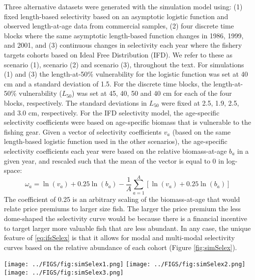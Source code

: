 Three alternative datasets were generated with the simulation model using: (1) fixed length-based selectivity based on an asymptotic logistic function and observed length-at-age data from commercial samples, (2) four discrete time blocks where the same asymptotic length-based function changes in 1986, 1999, and 2001, and (3) continuous changes in selectivity each year where the fishery targets cohorts based on Ideal Free Distribution (IFD).  We refer to these as scenario (1), scenario (2) and scenario (3), throughout the text.  For simulations (1) and (3) the length-at-50\% vulnerability for the logistic function was set at 40 cm and a standard deviation of 1.5.  For the discrete time blocks, the length-at-50\% vulnerability ($L_{50}$) was set at 45, 40, 50 and 40 cm for each of the four blocks, respectively.  The standard deviations in $L_{50}$ were fixed at 2.5, 1.9, 2.5, and 3.0 cm, respectively.  For the IFD selectivity model, the age-specific selectivity coefficients were based on age-specific biomass that is vulnerable to the fishing gear.  Given a vector of selectivity coefficients $v_a$ (based on the same length-based logistic function used in the other scenarios), the age-specific selectivity coefficients each year were based on the relative biomass-at-age $b_a$ in a given year, and rescaled such that the mean of the vector is equal to 0 in log-space:
\begin{equation}\label{eq:ifsSelex}
	\omega_a = \ln(v_a) + 0.25\ln(b_a) - 
	\frac{1}{A}\sum_{a=1}^A \left[ \ln(v_a) + 0.25\ln(b_a)\right]
\end{equation}
The coefficient of 0.25 is an arbitrary scaling of the biomass-at-age that would relate price premiums to larger size fish.  The larger the price premium the less dome-shaped the selectivity curve would be because there is a financial incentive to target larger more valuable fish that are less abundant.  In any case, the unique feature of \eqref{eq:ifsSelex} is that it allows for modal and multi-modal selectivity curves based on the relative abundance of each cohort (Figure \ref{fig:simSelex}).

\begin{figure*}[!tbh]
	\begin{center}
		\texttt{[image: ../FIGS/fig:simSelex1.png]}
		\hspace{-1.25cm}
		\texttt{[image: ../FIGS/fig:simSelex2.png]}
		\hspace{-1.25cm}
		\texttt{[image: ../FIGS/fig:simSelex3.png]}
	\end{center}
	\caption{True selectivity curves used to generate simulated data sets for scenario 1 (left), scenario 2 (middle), scenario 3 (right).}
	\label{fig:simSelex}
\end{figure*}

